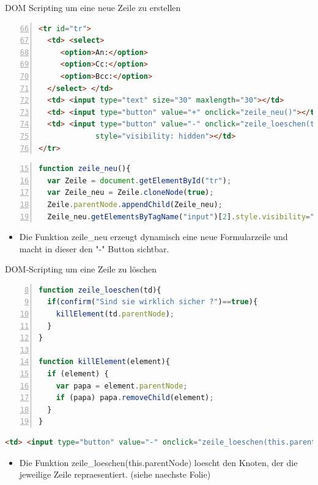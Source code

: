 \begin{frame}[<+->][fragile]{DOM Scripting um eine neue Zeile zu erstellen}
\tiny{ \begin{lstlisting}[language = HTML,
                                   mathescape = true, 
                   breaklines=true, 
                   numbers = left,
	        firstnumber=66 , 
                   numbersep = 3pt]
<tr id="tr">
  <td> <select>
     <option>An:</option>
     <option>Cc:</option>
     <option>Bcc:</option>
  </select> </td>
  <td> <input type="text" size="30" maxlength="30"></td>
  <td> <input type="button" value="+" onclick="zeile_neu()"></td>
  <td> <input type="button" value="-" onclick="zeile_loeschen(this.parentNode)" 
             style="visibility: hidden"></td>
</tr>
\end{lstlisting}}
\tiny{ \begin{lstlisting}[language=JavaScript, 
		   numbers=left,
		   numbersep=3pt,
		   firstnumber= 15,
		   breaklines=true]
function zeile_neu(){
  var Zeile = document.getElementById("tr");
  var Zeile_neu = Zeile.cloneNode(true);
  Zeile.parentNode.appendChild(Zeile_neu);
  Zeile_neu.getElementsByTagName("input")[2].style.visibility="visible";}
\end{lstlisting}}
\normalsize{
\begin{itemize}
\item Die Funktion zeile\_neu erzeugt dynamisch eine neue Formularzeile und macht in dieser den "-" Button sichtbar.
\end{itemize}
}
\end{frame}
\begin{frame}[<+->][fragile]{DOM-Scripting um eine Zeile zu löschen}
\tiny{ \begin{lstlisting}[language=JavaScript, 
		   numbers=left,
		   numbersep=3pt,
		   firstnumber= 8,
		   breaklines=true]
function zeile_loeschen(td){
  if(confirm("Sind sie wirklich sicher ?")==true){
    killElement(td.parentNode);
  }
}

function killElement(element){
  if (element) {
    var papa = element.parentNode;
    if (papa) papa.removeChild(element);
  }
}

\end{lstlisting}}
\tiny{ \begin{lstlisting}[language = HTML,
                                   mathescape = true, 
                   breaklines=true,  
                   numbersep = 3pt]
<td> <input type="button" value="-" onclick="zeile_loeschen(this.parentNode)" style="visibility:visible"> </td>
\end{lstlisting}}
\normalsize
\begin{itemize}
\item Die Funktion zeile\_loeschen(this.parentNode) loescht den Knoten, der die jeweilige Zeile repraesentiert. (siehe naechste Folie) 
\end{itemize}
\end{frame}
